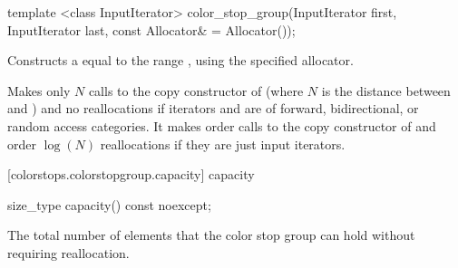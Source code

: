 \begin{itemdecl}
	template <class InputIterator>
	color_stop_group(InputIterator first, InputIterator last,
	  const Allocator& = Allocator());
\end{itemdecl}
\begin{itemdescr}
	\pnum
	\effects
	Constructs a  equal to the range , using the specified allocator.
	
	\pnum
	\complexity
	Makes only $N$ calls to the copy constructor of  (where $N$
	is the distance between
	and
	)
	and no reallocations if iterators  and  are of forward, bidirectional, or random access categories.
	It makes order
	calls to the copy constructor of
	and order
	$\log(N)$
	reallocations if they are just input iterators.
	
\end{itemdescr}

 [colorstops.colorstopgroup.capacity] { capacity}

\begin{itemdecl}
	size_type capacity() const noexcept;
\end{itemdecl}
\begin{itemdescr}
	\pnum
	\returns
	The total number of elements that the color stop group can hold without requiring reallocation.
\end{itemdescr}

